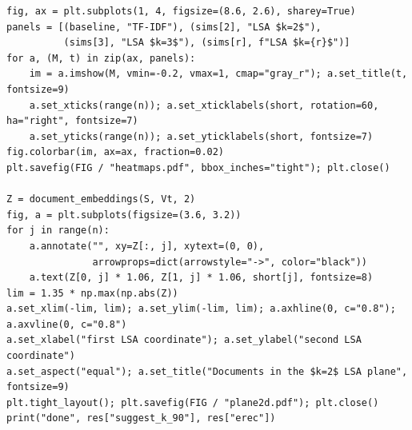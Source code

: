 \documentclass[12pt,a4paper]{report}
\theoremstyle{plain}
\theoremstyle{definition}
\theoremstyle{remark}
\theoremstyle{definition}
\begin{document}
\begin{lstlisting}
fig, ax = plt.subplots(1, 4, figsize=(8.6, 2.6), sharey=True)
panels = [(baseline, "TF-IDF"), (sims[2], "LSA $k=2$"),
          (sims[3], "LSA $k=3$"), (sims[r], f"LSA $k={r}$")]
for a, (M, t) in zip(ax, panels):
    im = a.imshow(M, vmin=-0.2, vmax=1, cmap="gray_r"); a.set_title(t, fontsize=9)
    a.set_xticks(range(n)); a.set_xticklabels(short, rotation=60, ha="right", fontsize=7)
    a.set_yticks(range(n)); a.set_yticklabels(short, fontsize=7)
fig.colorbar(im, ax=ax, fraction=0.02)
plt.savefig(FIG / "heatmaps.pdf", bbox_inches="tight"); plt.close()

Z = document_embeddings(S, Vt, 2)
fig, a = plt.subplots(figsize=(3.6, 3.2))
for j in range(n):
    a.annotate("", xy=Z[:, j], xytext=(0, 0),
               arrowprops=dict(arrowstyle="->", color="black"))
    a.text(Z[0, j] * 1.06, Z[1, j] * 1.06, short[j], fontsize=8)
lim = 1.35 * np.max(np.abs(Z))
a.set_xlim(-lim, lim); a.set_ylim(-lim, lim); a.axhline(0, c="0.8"); a.axvline(0, c="0.8")
a.set_xlabel("first LSA coordinate"); a.set_ylabel("second LSA coordinate")
a.set_aspect("equal"); a.set_title("Documents in the $k=2$ LSA plane", fontsize=9)
plt.tight_layout(); plt.savefig(FIG / "plane2d.pdf"); plt.close()
print("done", res["suggest_k_90"], res["erec"])
\end{lstlisting}
\end{document}
